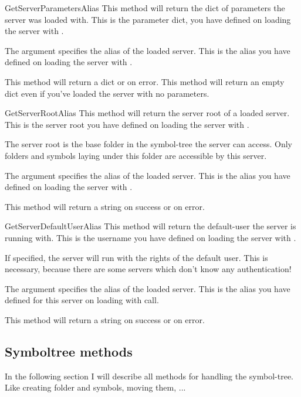 \begin{methoddesc}[System]{GetServerParameters}{Alias}
This method will return the dict of parameters the server was loaded with. 
This is the parameter dict, you have defined on loading the server with 
.

The argument  specifies the alias of the loaded server. This is
the alias you have defined on loading the server with .

This method will return a dict or  on error. This method will
return an empty dict even if you've loaded the server with no parameters.
\end{methoddesc}


\begin{methoddesc}[System]{GetServerRoot}{Alias}
This method will return the server root of a loaded server. This is the 
server root you have defined on loading the server with .

The server root is the base folder in the symbol-tree the server can access. 
Only folders and symbols laying under this folder are accessible by this 
server.

The argument  specifies the alias of the loaded server. This is the
alias you have defined on loading the server with . 

This method will return a string on success or  on error.
\end{methoddesc}


\begin{methoddesc}[System]{GetServerDefaultUser}{Alias}
This method will return the default-user the server is running with. This is
the username you have defined on loading the server with .

If specified, the server will run with the rights of the default user. This is
necessary, because there are some servers which don't know any authentication!

The argument  specifies the alias of the loaded server. This is the 
alias you have defined for this server on loading with  
call.

This method will return a string on success or  on error.
\end{methoddesc}


\subsection{Symboltree methods}
In the following section I will describe all methods for handling the symbol-tree. 
Like creating folder and symbols, moving them, ...

